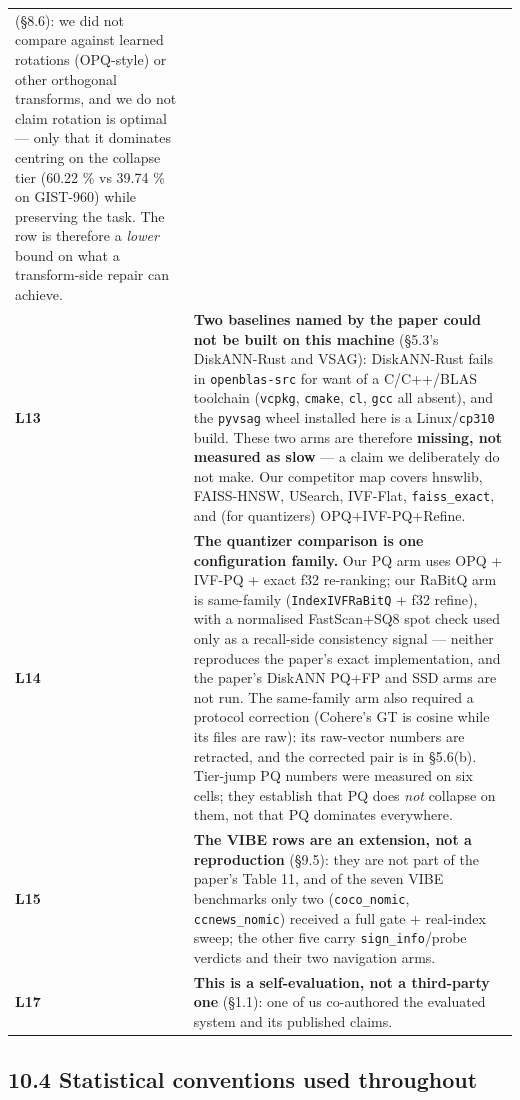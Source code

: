 \documentclass[
  10pt,
]{article}
\begin{document}
{\begin{longtable}[]{@{}
  >{\raggedright\arraybackslash}p{}
  >{\raggedright\arraybackslash}p{}@{}}
{transform was tested} (§8.6): we did not compare against learned
rotations (OPQ-style) or other orthogonal transforms, and we do not
claim rotation is optimal --- only that it dominates centring on the
collapse tier (60.22 \% vs 39.74 \% on GIST-960) while preserving the
task. The row is therefore a \emph{lower} bound on what a transform-side
repair can achieve. \\
\textbf{L13} & \textbf{Two baselines named by the paper could not be
built on this machine} (§5.3's DiskANN-Rust and VSAG): DiskANN-Rust
fails in \texttt{openblas-src} for want of a C/C++/BLAS toolchain
(\texttt{vcpkg}, \texttt{cmake}, \texttt{cl}, \texttt{gcc} all absent),
and the \texttt{pyvsag} wheel installed here is a Linux/\texttt{cp310}
build. These two arms are therefore \textbf{missing, not measured as
slow} --- a claim we deliberately do not make. Our competitor map covers
hnswlib, FAISS-HNSW, USearch, IVF-Flat, \texttt{faiss\_exact}, and (for
quantizers) OPQ+IVF-PQ+Refine. \\
\textbf{L14} & \textbf{The quantizer comparison is one configuration
family.} Our PQ arm uses OPQ + IVF-PQ + exact f32 re-ranking; our RaBitQ
arm is same-family (\texttt{IndexIVFRaBitQ} + f32 refine), with a
normalised FastScan+SQ8 spot check used only as a recall-side
consistency signal --- neither reproduces the paper's exact
implementation, and the paper's DiskANN PQ+FP and SSD arms are not run.
The same-family arm also required a protocol correction (Cohere's GT is
cosine while its files are raw): its raw-vector numbers are retracted,
and the corrected pair is in §5.6(b). Tier-jump PQ numbers were measured
on six cells; they establish that PQ does \emph{not} collapse on them,
not that PQ dominates everywhere. \\
\textbf{L15} & \textbf{The VIBE rows are an extension, not a
reproduction} (§9.5): they are not part of the paper's Table 11, and of
the seven VIBE benchmarks only two (\texttt{coco\_nomic},
\texttt{ccnews\_nomic}) received a full gate + real-index sweep; the
other five carry \texttt{sign\_info}/probe verdicts and their two
navigation arms. \\
\textbf{L17} & \textbf{This is a self-evaluation, not a third-party one}
(§1.1): one of us co-authored the evaluated system and its published
claims. \\
\end{longtable}
}

\subsection{10.4 Statistical conventions used
throughout}\label{statistical-conventions-used-throughout}
\end{document}
